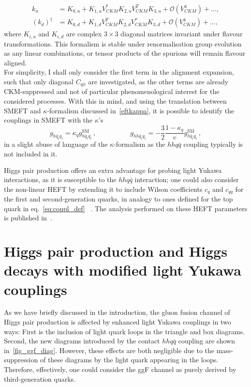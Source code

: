 \begin{align}
	k_u &= K_{0,u}+ K_{1,u} V^*_{CKM} K_{2,u} V^T_{CKM} K_{3,u} + \mathcal O(V^4_{CKM})+ \dots,  \\
	(k_d)^\dagger&=K_{0,d}+ K_{1,d} V^T_{CKM} K_{2,d} V^*_{CKM} K_{3,d} + \mathcal O(V^4_{CKM}) + \dots,
	\label{eqK}
\end{align}
where $K_{i,u}$ and $K_{i,d}$ are complex $3\times3$ diagonal matrices invariant under flavour transformations. This formalism is stable under renormalisation group evolution as any linear combinations, or tensor products of the spurions will remain flavour aligned. \\
For simplicity, I shall only consider the first term in the alignment expansion, such that only diagonal $C_{q\phi}$ are investigated, as the other terms are already CKM-suppressed and not of particular phenomenological interest for the considered processes.  With this in mind, and using the translation between SMEFT and $\kappa$-formalism discussed in~\autoref{eftkappa}, it is possible to identify the couplings in SMEFT with the $\kappa$'s
\begin{equation}
	g_{h\bar{q}_i q_i} =\kappa_q g_{h\bar{q}_i q_i}^{\text{SM}} \,, \quad \quad \quad \quad \quad g_{h h\bar{q}_i q_i}= - \frac{3}{2}\frac{1-\kappa_q}{v}g_{h\bar{q}_i q_i}^{\text{SM}} \,,
	\label{eq:def_kappa}
\end{equation}
in a slight abuse of language of the $\kappa$-formalism as the $hhq \bar q$ coupling typically is not included in it.
\par
Higgs pair production offers an extra advantage for probing light Yukawa interactions, as it is susceptible to the $hh q\bar q$ interaction; one could also consider the non-linear HEFT by extending it to include Wilson coefficients $c_q$ and $c_{qq}$ for the first and second-generation quarks, in analogy to ones defined for the top quark in eq.~\eqref{eq:coupl_def}~ \cite{Contino:2010mh}. The analysis performed on these HEFT parameters is published in~\cite{Alasfar:2019pmn}. 
\section{Higgs pair production and Higgs decays with modified light Yukawa couplings \label{sec:qqHH}}
As we have briefly discussed in the introduction, the gluon fusion channel of Higgs pair production is affected by enhanced light Yukawa couplings in two ways: First is the inclusion of light quark loops in the triangle and box diagrams. Second, the new diagrams introduced by the contact $hh q\bar q$ coupling are shown in~\autoref{fig_ggf_diag}. However, these effects are both negligible due to the mass-suppression of these diagrams by the light quark appearing in the loops. Therefore, effectively, one could consider the ggF channel as purely derived by third-generation quarks.
